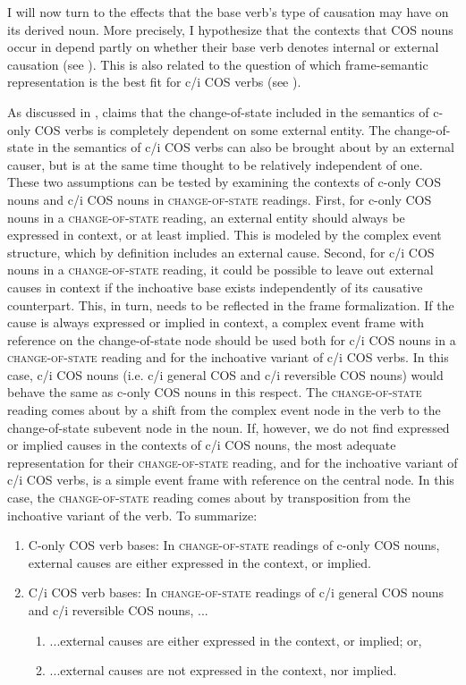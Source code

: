 I will now turn to the effects that the base verb's type of causation may have on its derived noun.
More precisely, I hypothesize that the contexts that COS nouns occur in depend partly on whether their base verb denotes internal or external causation (see ). This is also related to the question of which frame-semantic representation is the best fit for c/i COS verbs (see ).

As discussed in , \citet{Smith.1970} claims that the change-of-state included in the semantics of c-only COS verbs is completely dependent on some external entity. The change-of-state in the semantics of c/i COS verbs can also be brought about by an external causer, but is at the same time thought to be relatively independent of one. These two assumptions can be tested by examining the contexts of c-only COS nouns and c/i COS nouns in \textsc{change-of-state} readings. 
First, for c-only COS nouns in a \textsc{change-of-state} reading, an external entity should always be expressed in context, or at least implied. This is modeled by the complex event structure, which by definition includes an external cause.
Second, for c/i COS nouns in a \textsc{change-of-state} reading, it could be possible to leave out external causes in context if the inchoative base exists independently of its causative counterpart. 
This, in turn, needs to be reflected in the frame formalization. 
If the cause is always expressed or implied in context, a complex event frame with reference on the change-of-state node should be used both for c/i COS nouns in a \textsc{change-of-state} reading and for the inchoative variant of c/i COS verbs.
In this case, c/i COS nouns (i.e. c/i general COS and c/i reversible COS nouns) would behave the same as c-only COS nouns in this respect. The \textsc{change-of-state} reading comes about by a shift from the complex event node in the verb to the change-of-state subevent node in the noun.
If, however, we do not find expressed or implied causes in the contexts of c/i COS nouns, the most adequate representation for their \textsc{change-of-state} reading, and for the inchoative variant of c/i COS verbs, is a simple event frame with reference on the central node. In this case, the \textsc{change-of-state} reading comes about by transposition from the inchoative variant of the verb.
To summarize: 

\begin{enumerate}\sloppy
  \item C-only COS verb bases: In \textsc{change-of-state} readings of c-only COS nouns, external causes are either expressed in the context, or implied.
  \item C/i COS verb bases: In \textsc{change-of-state} readings of c/i general COS nouns and c/i reversible COS nouns, ... 
  \begin{enumerate}
    \item ...external causes are either expressed in the context, or implied; or,
    \item ...external causes are not expressed in the context, nor implied.
  \end{enumerate}
\end{enumerate} 

